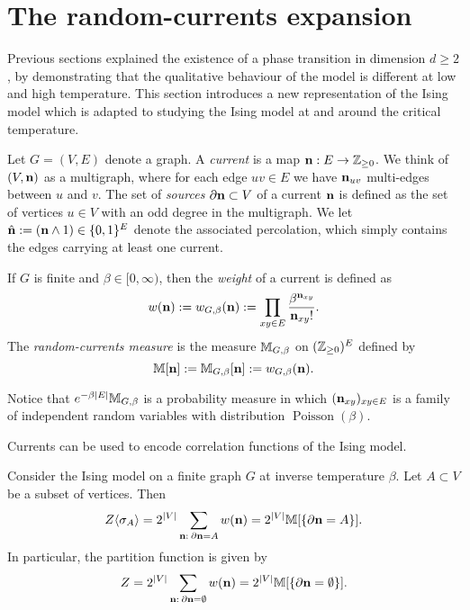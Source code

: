 \section{The random-currents expansion}

Previous sections explained the existence of a phase transition in dimension
$d\geq 2$, by demonstrating that the qualitative behaviour of the model 
is different at low and high temperature.
This section introduces a new representation of the Ising model
which is adapted to studying the Ising model at and around the critical temperature.

\begin{definition}[Currents]
    Let $G=(V,E)$ denote a graph.
    A \emph{current} is a map $\mathbf{n}:E\to\mathbb Z_{\geq 0}$.
    We think of $(V,\mathbf{n})$ as a multigraph,
    where for each edge $uv\in E$ we have $\mathbf{n}_{uv}$ multi-edges between $u$ and $v$.
    The set of \emph{sources} $\partial\mathbf{n}\subset V$ of a current
    $\mathbf{n}$ is defined as the set of vertices $u\in V$ with an odd degree in the multigraph.
    We let $\hat{\mathbf{n}}:=(\mathbf{n}\wedge 1)\in\{0,1\}^E$ denote the associated percolation,
    which simply contains the edges carrying at least one current.

    If $G$ is finite and $\beta\in[0,\infty)$, then the
    \emph{weight} of a current is defined as
    \[
        w(\mathbf{n}):=w_{G,\beta}(\mathbf{n}):=\prod_{xy\in E}
        \frac{\beta^{\mathbf{n}_{xy}}}{\mathbf{n}_{xy}!}.
    \]
    The \emph{random-currents measure} is the measure $\mathbb M_{G,\beta}$ on $(\mathbb Z_{\geq 0})^E$
    defined by
    \[
        \mathbb M[\mathbf{n}]:=\mathbb M_{G,\beta}[\mathbf{n}]:=w_{G,\beta}(\mathbf{n}).
    \]
\end{definition}

\begin{remark}
    Notice that $e^{-\beta|E|}\mathbb M_{G,\beta}$ is a probability measure
    in which $(\mathbf{n}_{xy})_{xy\in E}$ is a family of independent
    random variables with distribution $\operatorname{Poisson}(\beta)$.
\end{remark}

Currents can be used to encode correlation functions of the Ising model.

\begin{theorem}
    \label{thm:current_representation_of_correlation_functions}
    Consider the Ising model on a finite graph $G$ at inverse temperature $\beta$.
    Let $A\subset V$ be a subset of vertices.
    Then
    \[
        Z\langle\sigma_A\rangle
        =2^{|V|}\sum_{\mathbf{n}:\:\partial\mathbf{n}=A}
        w(\mathbf{n})
        =
        2^{|V|}\mathbb M[\{\partial\mathbf{n}=A\}].
    \]
    In particular, the partition function is given by
    \[
        Z=2^{|V|}\sum_{\mathbf{n}:\:\partial\mathbf{n}=\emptyset}
        w(\mathbf{n})
        =
        2^{|V|}\mathbb M[\{\partial\mathbf{n}=\emptyset\}].
    \]
\end{theorem}

